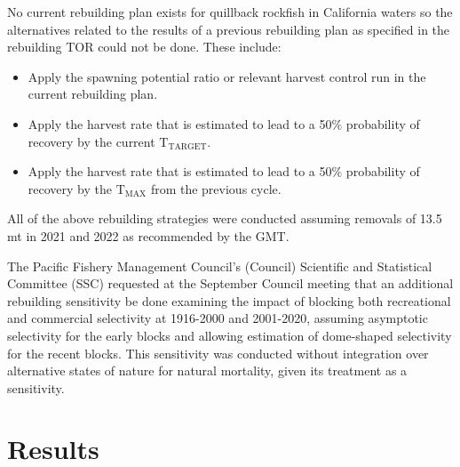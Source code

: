 \documentclass[11pt,
  english,
  a4paper,
]{article}
\begin{document}
\leavevmode\tagmcend\tagstructend\par


No current rebuilding plan exists for quillback rockfish in California waters so the alternatives related to the results of a previous rebuilding plan as specified in the rebuilding TOR could not be done. These include:

\leavevmode\tagmcend\tagstructend\par

\begin{itemize}
 \item Apply the spawning potential ratio or relevant harvest control run in the current rebuilding plan. 
 \item Apply the harvest rate that is estimated to lead to a 50$\%$ probability of recovery by the current $\text{T}_\text{TARGET}$.
 \item Apply the harvest rate that is estimated to lead to a 50$\%$ probability of recovery by the $\text{T}_\text{MAX}$ from the previous cycle.
\end{itemize}


All of the above rebuilding strategies were conducted assuming removals of 13.5 mt in 2021 and 2022 as recommended by the GMT.

\leavevmode\tagmcend\tagstructend\par


The Pacific Fishery Management Council's (Council) Scientific and Statistical Committee (SSC) requested at the September Council meeting that an additional rebuilding sensitivity be done examining the impact of blocking both recreational and commercial selectivity at 1916-2000 and 2001-2020, assuming asymptotic selectivity for the early blocks and allowing estimation of dome-shaped selectivity for the recent blocks. This sensitivity was conducted without integration over alternative states of nature for natural mortality, given its treatment as a sensitivity.

\leavevmode\tagmcend\tagstructend\par


\hypertarget{results}{%
\section{Results}\label{results}}
\end{document}
